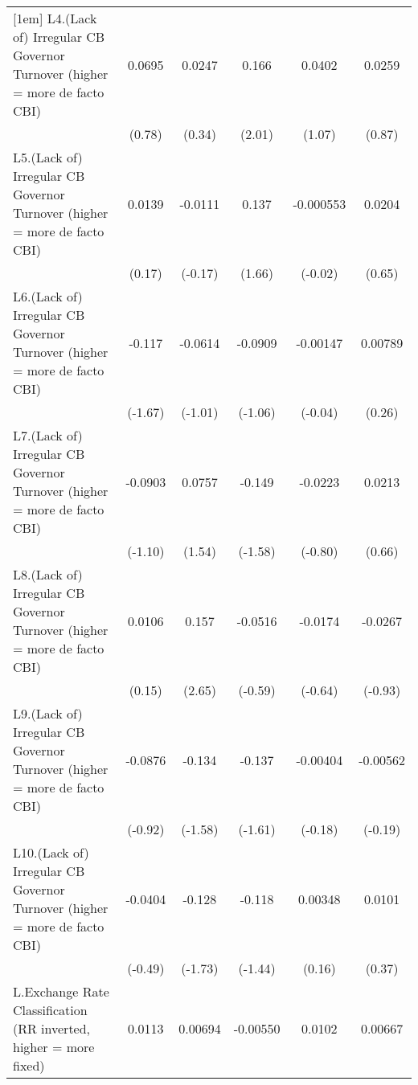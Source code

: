 {\begin{longtable}{l*{5}{c}}
[1em]
L4.(Lack of) Irregular CB Governor Turnover (higher = more de facto CBI)&   0.0695         &   0.0247         &    0.166\sym{*}  &   0.0402         &   0.0259         \\
                &   (0.78)         &   (0.34)         &   (2.01)         &   (1.07)         &   (0.87)         \\
[1em]
L5.(Lack of) Irregular CB Governor Turnover (higher = more de facto CBI)&   0.0139         &  -0.0111         &    0.137         &-0.000553         &   0.0204         \\
                &   (0.17)         &  (-0.17)         &   (1.66)         &  (-0.02)         &   (0.65)         \\
[1em]
L6.(Lack of) Irregular CB Governor Turnover (higher = more de facto CBI)&   -0.117         &  -0.0614         &  -0.0909         & -0.00147         &  0.00789         \\
                &  (-1.67)         &  (-1.01)         &  (-1.06)         &  (-0.04)         &   (0.26)         \\
[1em]
L7.(Lack of) Irregular CB Governor Turnover (higher = more de facto CBI)&  -0.0903         &   0.0757         &   -0.149         &  -0.0223         &   0.0213         \\
                &  (-1.10)         &   (1.54)         &  (-1.58)         &  (-0.80)         &   (0.66)         \\
[1em]
L8.(Lack of) Irregular CB Governor Turnover (higher = more de facto CBI)&   0.0106         &    0.157\sym{**} &  -0.0516         &  -0.0174         &  -0.0267         \\
                &   (0.15)         &   (2.65)         &  (-0.59)         &  (-0.64)         &  (-0.93)         \\
[1em]
L9.(Lack of) Irregular CB Governor Turnover (higher = more de facto CBI)&  -0.0876         &   -0.134         &   -0.137         & -0.00404         & -0.00562         \\
                &  (-0.92)         &  (-1.58)         &  (-1.61)         &  (-0.18)         &  (-0.19)         \\
[1em]
L10.(Lack of) Irregular CB Governor Turnover (higher = more de facto CBI)&  -0.0404         &   -0.128         &   -0.118         &  0.00348         &   0.0101         \\
                &  (-0.49)         &  (-1.73)         &  (-1.44)         &   (0.16)         &   (0.37)         \\
[1em]
L.Exchange Rate Classification (RR inverted, higher = more fixed)&   0.0113         &  0.00694         & -0.00550         &   0.0102         &  0.00667\sym{*}  \\

\end{longtable}}
